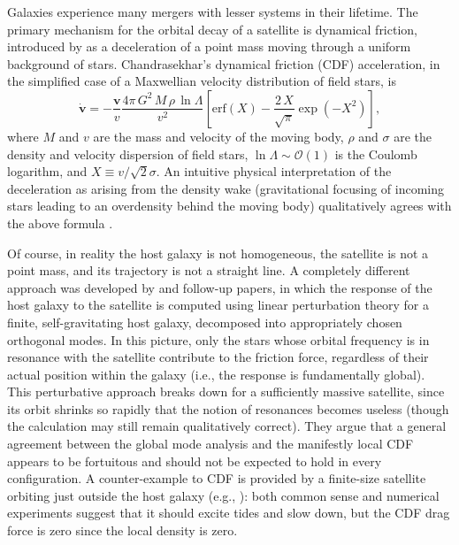 \documentclass[twocolumn]{aastex63}
\begin{document}
Galaxies experience many mergers with lesser systems in their lifetime. The primary mechanism for the orbital decay of a satellite is dynamical friction, introduced by \citet{Chandrasekhar1943} as a deceleration of a point mass moving through a uniform background of stars. Chandrasekhar's dynamical friction (CDF) acceleration, in the simplified case of a Maxwellian velocity distribution of field stars, is
\begin{equation}  \label{eq:CDF}
\dot{\boldsymbol v} = -\frac{\boldsymbol v}{v} \frac{4\pi\, G^2\, M\, \rho\, \ln\Lambda}{v^2} 
\left[ \mathrm{erf}(X)-\frac{2\,X}{\sqrt{\pi}}\exp(-X^2)\right],
\end{equation}
where $M$ and $v$ are the mass and velocity of the moving body, $\rho$ and $\sigma$ are the density and velocity dispersion of field stars, $\ln\Lambda \sim \mathcal O(1)$ is the Coulomb logarithm, and $X\equiv v/\sqrt{2}\sigma$.
An intuitive physical interpretation of the deceleration as arising from the density wake (gravitational focusing of incoming stars leading to an overdensity behind the moving body) qualitatively agrees with the above formula \citep{Mulder1983}. 

Of course, in reality the host galaxy is not homogeneous, the satellite is not a point mass, and its trajectory is not a straight line. A completely different approach was developed by \citet{Tremaine1984} and follow-up papers, in which the response of the host galaxy to the satellite is computed using linear perturbation theory for a finite, self-gravitating host galaxy, decomposed into appropriately chosen orthogonal modes. In this picture, only the stars whose orbital frequency is in resonance with the satellite contribute to the friction force, regardless of their actual position within the galaxy (i.e., the response is fundamentally global). This perturbative approach breaks down for a sufficiently massive satellite, since its orbit shrinks so rapidly that the notion of resonances becomes useless (though the calculation may still remain qualitatively correct). They argue that a general agreement between the global mode analysis and the manifestly local CDF appears to be fortuitous and should not be expected to hold in every configuration. A counter-example to CDF is provided by a finite-size satellite orbiting just outside the host galaxy (e.g., \citealt{Weinberg1986}): both common sense and numerical experiments suggest that it should excite tides and slow down, but the CDF drag force is zero since the local density is zero.
\end{document}
